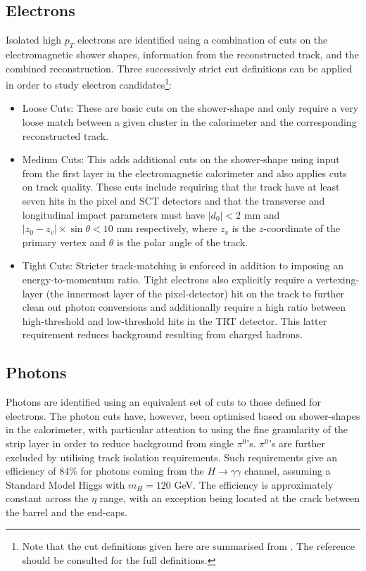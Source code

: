 \subsection{Electrons}
\label{electron_reco}
Isolated high $p_{T}$ electrons are identified using a combination of cuts on the electromagnetic shower shapes, information from the reconstructed track, and the combined reconstruction. Three successively strict cut definitions can be applied in order to study electron candidates\footnote{Note that the cut definitions given here are summarised from \cite{ATLAS}. The reference should be consulted for the full definitions.}:
\begin{itemize}
\item Loose Cuts: These are basic cuts on the shower-shape and only require a very loose match between a given cluster in the calorimeter and the corresponding reconstructed track.
\item Medium Cuts: This adds additional cuts on the shower-shape using input from the first layer in the electromagnetic calorimeter and also applies cuts on track quality. These cuts include requiring that the track have at least seven hits in the pixel and SCT detectors and that the transverse and longitudinal impact parameters must have $| d_{0} | < 2$ mm and $| z_{0}-z_{v} | \times \sin\theta < 10$ mm respectively, where $z_{v}$ is the $z$-coordinate of the primary vertex and $\theta$ is the polar angle of the track.
\item Tight Cuts: Stricter track-matching is enforced in addition to imposing an energy-to-momentum ratio. Tight electrons also explicitly require a vertexing-layer (the innermost layer of the pixel-detector) hit on the track to further clean out photon conversions and additionally require a high ratio between high-threshold and low-threshold hits in the TRT detector. This latter requirement reduces background resulting from charged hadrons.
\end{itemize}
\subsection{Photons}
Photons are identified using an equivalent set of cuts to those defined for electrons. The photon cuts have, however, been optimised based on shower-shapes in the calorimeter, with particular attention to using the fine granularity of the strip layer in order to reduce background from single $\pi^{0}$'s. $\pi^{0}$'s are further excluded by utilising track isolation requirements. Such requirements give an efficiency of 84$\%$ for photons coming from the $H \longrightarrow \gamma \gamma$ channel, assuming a Standard Model Higgs with $m_{H} = 120$ GeV. The efficiency is approximately constant across the $\eta$ range, with an exception being located at the crack between the barrel and the end-caps.
